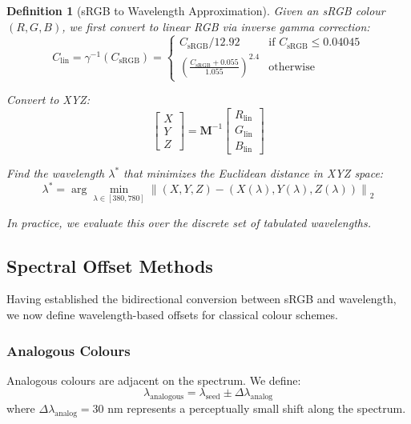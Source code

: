 \documentclass[12pt,a4paper]{article}
\newtheorem{definition}[theorem]{Definition}
\newcommand{\wavelength}{\lambda}
\begin{document}
\begin{definition}[sRGB to Wavelength Approximation]
Given an sRGB colour $(R, G, B)$, we first convert to linear RGB via inverse gamma correction:
\begin{equation}
C_{\text{lin}} = \gamma^{-1}(C_{\text{sRGB}}) = \begin{cases}
C_{\text{sRGB}} / 12.92 & \text{if } C_{\text{sRGB}} \leq 0.04045 \\
\left(\frac{C_{\text{sRGB}} + 0.055}{1.055}\right)^{2.4} & \text{otherwise}
\end{cases}
\end{equation}

Convert to XYZ:
\begin{equation}
\begin{bmatrix} X \\ Y \\ Z \end{bmatrix} = \mathbf{M}^{-1}
\begin{bmatrix} R_{\text{lin}} \\ G_{\text{lin}} \\ B_{\text{lin}} \end{bmatrix}
\end{equation}

Find the wavelength $\wavelength^*$ that minimizes the Euclidean distance in XYZ space:
\begin{equation}
\wavelength^* = \arg\min_{\wavelength \in [380, 780]} \left\| (X, Y, Z) - (X(\wavelength), Y(\wavelength), Z(\wavelength)) \right\|_2
\end{equation}

In practice, we evaluate this over the discrete set of tabulated wavelengths.
\end{definition}

\subsection{Spectral Offset Methods}

Having established the bidirectional conversion between sRGB and wavelength, we now define wavelength-based offsets for classical colour schemes.

\subsubsection{Analogous Colours}

Analogous colours are adjacent on the spectrum. We define:
\begin{equation}
\wavelength_{\text{analogous}} = \wavelength_{\text{seed}} \pm \Delta\wavelength_{\text{analog}}
\end{equation}
where $\Delta\wavelength_{\text{analog}} = 30$ nm represents a perceptually small shift along the spectrum.
\end{document}

